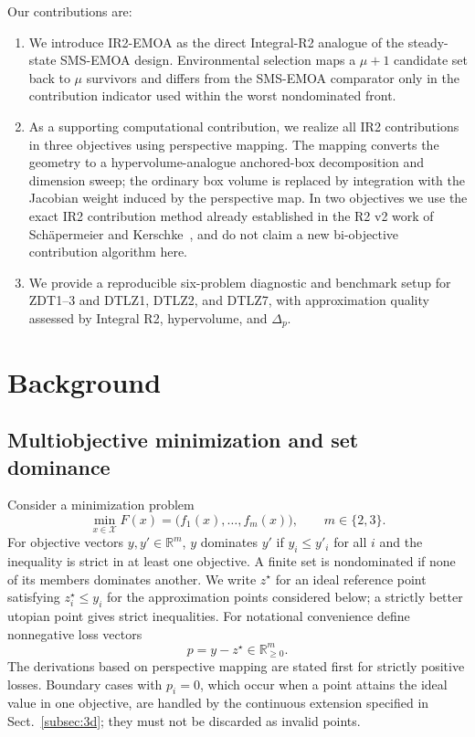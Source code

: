 \documentclass[runningheads]{llncs}
\newcommand{\R}{\mathbb{R}}
\begin{document}
Our contributions are:
\begin{enumerate}
    \item We introduce IR2-EMOA as the direct Integral-R2 analogue of the steady-state SMS-EMOA design. Environmental selection maps a $\mu+1$ candidate set back to $\mu$ survivors and differs from the SMS-EMOA comparator only in the contribution indicator used within the worst nondominated front.
    \item As a supporting computational contribution, we realize all IR2 contributions in three objectives using perspective mapping. The mapping converts the geometry to a hypervolume-analogue anchored-box decomposition and dimension sweep; the ordinary box volume is replaced by integration with the Jacobian weight induced by the perspective map. In two objectives we use the exact IR2 contribution method already established in the R2 v2 work of Sch\"apermeier and Kerschke~\cite{SchaepermeierKerschke2025}, and do not claim a new bi-objective contribution algorithm here.
    \item We provide a reproducible six-problem diagnostic and benchmark setup for ZDT1--3 and DTLZ1, DTLZ2, and DTLZ7, with approximation quality assessed by Integral R2, hypervolume, and $\Delta_p$.
\end{enumerate}

\section{Background}
\label{sec:background}

\subsection{Multiobjective minimization and set dominance}

Consider a minimization problem
\begin{equation}
    \min_{x\in\mathcal{X}} F(x)
    = \bigl(f_1(x),\ldots,f_m(x)\bigr),
    \qquad m\in\{2,3\}.
\end{equation}
For objective vectors $y,y'\in\R^m$, $y$ dominates $y'$ if $y_i\le y'_i$ for all $i$ and the inequality is strict in at least one objective. A finite set is nondominated if none of its members dominates another. We write $z^\star$ for an ideal reference point satisfying $z_i^\star\le y_i$ for the approximation points considered below; a strictly better utopian point gives strict inequalities. For notational convenience define nonnegative loss vectors
\begin{equation}
    p=y-z^\star\in\R^m_{\ge0}.
\end{equation}
The derivations based on perspective mapping are stated first for strictly positive losses. Boundary cases with $p_i=0$, which occur when a point attains the ideal value in one objective, are handled by the continuous extension specified in Sect.~\ref{subsec:3d}; they must not be discarded as invalid points.
\end{document}

